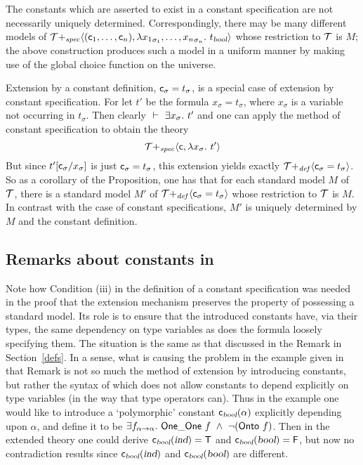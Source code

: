 \medskip

The constants which are asserted to exist in a constant specification
are not necessarily uniquely determined.  Correspondingly, there may
be many different models of ${\cal T}{+_{\it
spec}}\langle({\sf c}_1,\ldots,{\sf c}_n),
\lambda {x_1}_{\sigma_1},\ldots,{x_n}_{\sigma_n}.\ t_{\textsl{bool}}
\rangle$ whose restriction to $\cal T$ is $M$; the above construction
produces such a model in a uniform manner by making use of the global
choice function on the universe.

Extension by a constant definition, ${\sf c}_\sigma=t_\sigma$, is a
special case of extension by constant specification. For let $t'$ be
the formula $x_\sigma=t_\sigma$, where $x_\sigma$ is a variable not
occurring in $t_\sigma$. Then clearly $\ \vdash\ 
\exists x_\sigma.\ t'$ and one can apply the method of constant
specification to obtain the theory
\[
{\cal T}{+_{\it spec}}\langle {\sf c},\lambda x_\sigma.\ t'\rangle
\]
But since $t'[{\sf c}_\sigma/x_\sigma]$ is just
${\sf c}_\sigma=t_\sigma$,
this extension yields exactly ${\cal T}{+_{\it def}}\langle
{\sf c}_{\sigma}=t_{\sigma}\rangle$.
So as a corollary of the Proposition, one has that for each standard
model $M$ of $\cal T$, there is a standard model $M'$ of ${\cal
T}{+_{\it def}}\langle{\sf c}_{\sigma}=t_{\sigma}\rangle$ whose
restriction to $\cal T$ is $M$. In contrast with the case of constant
specifications, $M'$ is uniquely determined by $M$ and the constant
definition.

\subsection{Remarks about constants in \HOL{}}
\label{constants}

Note how Condition (iii) in the definition of a constant specification
was needed in the proof that the extension mechanism preserves the
property of possessing a standard model. Its role is to ensure that
the introduced constants have, via their types, the same dependency on
type variables as does the formula loosely specifying them. The
situation is the same as that discussed in the Remark in
Section~\ref{defs}. In a sense, what is causing the problem in the
example given in that Remark is not so much the method of extension by
introducing constants, but rather the syntax of \HOL{} which does not
allow constants to depend explicitly on type variables (in the way
that type operators can). Thus in the example one would like to
introduce a `polymorphic' constant ${\sf c}_{\textsl{bool}}(\alpha)$
explicitly depending upon $\alpha$, and define it to be
$\exists f_{\alpha{\to}\alpha}.\  {\sf One\_One} \ f \ \wedge\ 
\neg({\sf Onto} \ f)$.  Then in the extended theory one could derive
${\sf c}_{\textsl{bool}}(\textsl{ind})={\sf T}$ and
${\sf c}_{\textsl{bool}}(\textsl{bool})={\sf F}$, but now no contradiction results since
${\sf c}_{\textsl{bool}}(\textsl{ind})$ and ${\sf c}_{\textsl{bool}}(\textsl{bool})$
are different.

